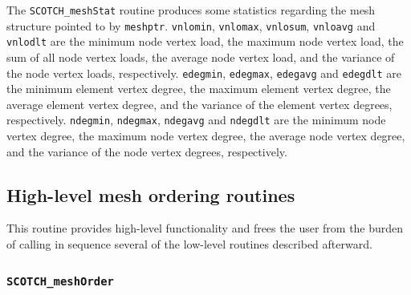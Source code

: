 \begin{itemize}
\progdes

The {\tt SCOTCH\_meshStat} routine produces some statistics regarding
the mesh structure pointed to by {\tt meshptr}.
{\tt vnlomin}, {\tt vnlomax}, {\tt vnlosum}, {\tt vnloavg} and
{\tt vnlodlt} are the minimum node vertex load, the maximum node
vertex load, the sum of all node vertex loads, the average node
vertex load, and the variance of the node vertex loads, respectively.
{\tt edegmin}, {\tt edegmax}, {\tt edegavg} and
{\tt edegdlt} are the minimum element vertex degree, the maximum
element vertex degree, the average element vertex degree, and the
variance of the element vertex degrees, respectively.
{\tt ndegmin}, {\tt ndegmax}, {\tt ndegavg} and
{\tt ndegdlt} are the minimum node vertex degree, the maximum
node vertex degree, the average node vertex degree, and the
variance of the node vertex degrees, respectively.
\end{itemize}

\subsection{High-level mesh ordering routines}

This routine provides high-level functionality and frees the
user from the burden of calling in sequence several of the low-level
routines described afterward.

\subsubsection{{\tt SCOTCH\_meshOrder}}

